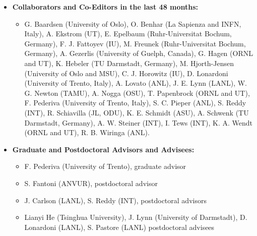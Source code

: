 \documentclass[11pt]{article}
\begin{document}
\begin{itemize}
\item{\bf Collaborators and Co-Editors in the last 48 months:}
\begin{itemize}
\item
G. Baardsen (University of Oslo),
O. Benhar (La Sapienza and INFN, Italy),
A. Ekstrom (UT),
E. Epelbaum (Ruhr-Universitat Bochum, Germany),
F. J. Fattoyev (IU),
M. Freunek (Ruhr-Universitat Bochum, Germany),
A. Gezerlis (University of Guelph, Canada),
G. Hagen (ORNL and UT),
K. Hebeler (TU Darmstadt, Germany),
M. Hjorth-Jensen (University of Oslo and MSU),
C. J. Horowitz (IU),
D. Lonardoni (University of Trento, Italy),
A. Lovato (ANL),
J. E. Lynn (LANL),
W. G. Newton (TAMU),
A. Nogga (OSU),
T. Papenbrock (ORNL and UT),
F. Pederiva (University of Trento, Italy),
S. C. Pieper (ANL),
S. Reddy (INT),
R. Schiavilla (JL, ODU),
K. E. Schmidt (ASU),
A. Schwenk (TU Darmstadt, Germany),
A. W. Steiner (INT),
I. Tews (INT),
K. A. Wendt (ORNL and UT),
R. B. Wiringa (ANL).
\end{itemize}

\item{\bf Graduate and Postdoctoral Advisors and Advisees:}
\begin{itemize}
\item F. Pederiva (University of Trento), graduate advisor
\item S. Fantoni (ANVUR), postdoctoral advisor
\item J. Carlson (LANL), S. Reddy (INT), postdoctoral advisors
\item Lianyi He (Tsinghua University), J. Lynn (University of Darmstadt), 
D. Lonardoni (LANL), S. Pastore (LANL) postdoctoral advisees
\end{itemize}


\end{itemize}
 
\end{document}
